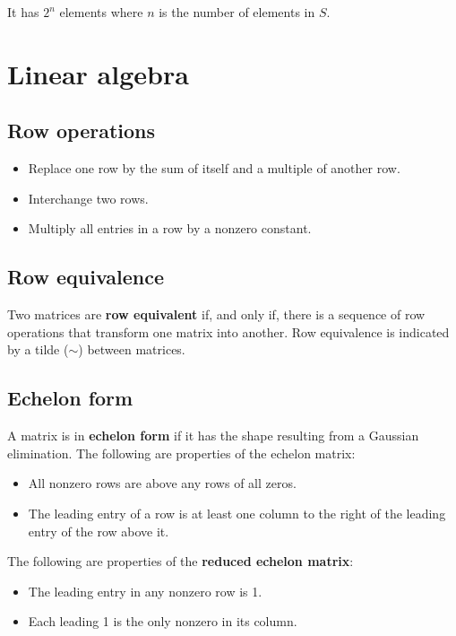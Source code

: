 \documentclass[12pt, oneside]{book}
\begin{document}
It has \(2^n\) elements where \(n\) is the number of elements in \(S\).

\chapter{Linear algebra}

\section{Row operations}
\begin{itemize}
\item{Replace one row by the sum of itself and a multiple of another row.}
\item{Interchange two rows.}
\item{Multiply all entries in a row by a nonzero constant.}
\end{itemize}

\section{Row equivalence}
Two matrices are \textbf{row equivalent} if, and only if, there is a sequence
of row operations that transform one matrix into another.
Row equivalence is indicated by a tilde (\(\sim\)) between matrices.
\section{Echelon form}
A matrix is in \textbf{echelon form} if it has the shape resulting from a
Gaussian
elimination.
The following are properties of the echelon matrix:
\begin{itemize}
\item{All nonzero rows are above any rows of all zeros.}
\item{The leading entry of a row is at least one column to the right of the
leading entry of the row above it.}
\end{itemize}
The following are properties of the \textbf{reduced echelon matrix}:
\begin{itemize}
\item{The leading entry in any nonzero row is 1.}
\item{Each leading 1 is the only nonzero in its column.}
\end{itemize}
\end{document}
